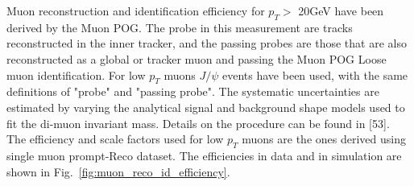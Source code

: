Muon reconstruction and identification efficiency for $p_{T}>$ 20GeV have been derived by the Muon POG. The probe in this measurement are tracks reconstructed in the inner tracker, and the passing probes are those that are also reconstructed as a global or tracker muon and passing the Muon POG Loose muon identification. For low $p_{T}$ muons $J/\psi$ events have been used, with the same definitions of
"probe" and "passing probe". The systematic uncertainties are estimated by varying the analytical signal and background shape models used to fit the di-muon invariant mass. Details on the procedure can be found in [53]. The efficiency and scale factors used for low $p_{T}$ muons
are the ones derived using single muon prompt-Reco dataset. The efficiencies in data and in simulation are shown in Fig.~\ref{fig:muon_reco_id_efficiency}.

